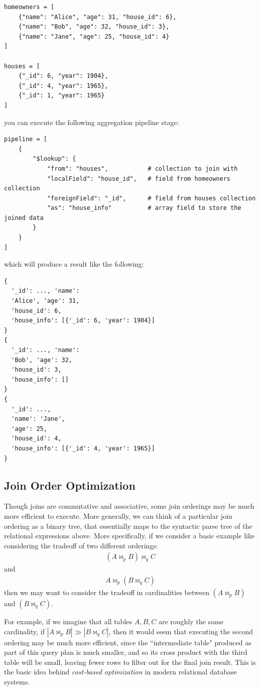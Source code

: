 \documentclass[10pt,a4paper]{article}
\begin{document}
\begin{verbatim}
homeowners = [
    {"name": "Alice", "age": 31, "house_id": 6},
    {"name": "Bob", "age": 32, "house_id": 3},
    {"name": "Jane", "age": 25, "house_id": 4}
]

houses = [
    {"_id": 6, "year": 1904},
    {"_id": 4, "year": 1965},
    {"_id": 1, "year": 1965}
]
\end{verbatim}
you can execute the following aggregation pipeline stage:
\begin{verbatim}
pipeline = [
    {
        "$lookup": {
            "from": "houses",           # collection to join with
            "localField": "house_id",   # field from homeowners collection
            "foreignField": "_id",      # field from houses collection
            "as": "house_info"          # array field to store the joined data
        }
    }
]
\end{verbatim}
which will produce a result like the following:
\begin{verbatim}
{
  '_id': ..., 'name':
  'Alice', 'age': 31, 
  'house_id': 6, 
  'house_info': [{'_id': 6, 'year': 1904}]
}
{
  '_id': ..., 'name': 
  'Bob', 'age': 32,
  'house_id': 3, 
  'house_info': []
}
{
  '_id': ..., 
  'name': 'Jane', 
  'age': 25, 
  'house_id': 4, 
  'house_info': [{'_id': 4, 'year': 1965}]
}
\end{verbatim}


\subsection*{Join Order Optimization}

Though joins are commutative and associative, some join orderings may be much more efficient to execute. More generally, we can think of a particular join ordering as a binary tree, that essentially maps to the syntactic parse tree of the relational expressions above. More specifically, if we consider a basic example like considering the tradeoff of two different orderings:
\begin{align*}
    (A \Join_p B) \Join_q C
\end{align*}
and 
\begin{align*}
    A \Join_p (B \Join_q C)
\end{align*}
then we may want to consider the tradeoff in cardinalities between $(A \Join_p B)$ and $(B \Join_q C)$. 

For example, if we imagine that all tables $A,B,C$ are roughly the same cardinality, if $|A \Join_p B| \gg |B \Join_q C|$, then it would seem that executing the second ordering may be much more efficient, since the ``intermediate table" produced as part of this query plan is much smaller, and so its cross product with the third table will be small, leaving fewer rows to filter out for the final join result. This is the basic idea behind \textit{cost-based optimization} in modern relational database systems. 
\end{document}
